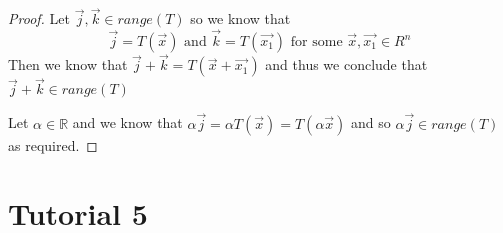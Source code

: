 \documentclass[notoc,notitlepage]{tufte-book}
\begin{document}
\begin{proof}
    Let $\vec{j}, \vec{k} \in \mathit{range} {\left( T \right)} $ so we know that 
    \begin{equation*}
        \vec{j} = T\left(\vec{x}\right) \text{ and } \vec{k} = T\left(\vec{x_1}\right) \text{ for some } \vec{x}, \vec{x_1} \in R^{n}
    \end{equation*}
    Then we know that $\vec{j} + \vec{k} = T\left(\vec{x} + \vec{x_1}\right)$ and thus we conclude that $\vec{j} + \vec{k} \in \mathit{range} {\left( T \right)} $ 

    Let $\alpha \in \mathbb{R}$ and we know that $\alpha \vec{j} = \alpha T\left(\vec{x}\right) = T\left(\alpha \vec{x}\right)$ and so $\alpha \vec{j} \in \mathit{range} {\left( T \right)} $ as required.
\end{proof}

\section{Tutorial 5}%
\label{sec:tutorial_5}
\end{document}
